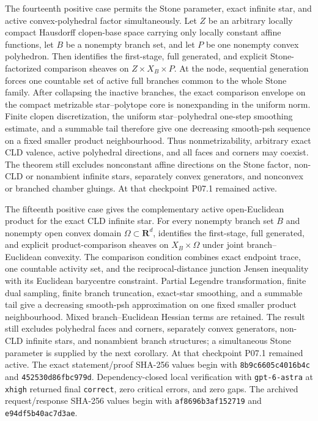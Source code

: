 The fourteenth positive case permits the Stone parameter, exact infinite
star, and active convex-polyhedral factor simultaneously.  Let \(Z\) be an
arbitrary locally compact Hausdorff clopen-base space carrying only locally
constant affine functions, let \(B\) be a nonempty branch set, and let
\(P\) be one nonempty convex polyhedron.  Then
 identifies the
first-stage, full generated, and explicit Stone-factorized comparison
sheaves on \(Z\times X_B\times P\).  At the node, sequential generation
forces one countable set of active full branches common to the whole Stone
family.  After collapsing the inactive branches, the exact comparison
envelope on the compact metrizable star--polytope core is nonexpanding in
the uniform norm.  Finite clopen discretization, the uniform
star--polyhedral one-step smoothing estimate, and a summable tail therefore
give one decreasing smooth-psh sequence on a fixed smaller product
neighbourhood.  Thus nonmetrizability, arbitrary exact CLD valence, active
polyhedral directions, and all faces and corners may coexist.  The theorem
still excludes nonconstant affine directions on the Stone factor, non-CLD
or nonambient infinite stars, separately convex generators, and nonconvex
or branched chamber gluings.  At that checkpoint P07.1 remained active.

The fifteenth positive case gives the complementary active open-Euclidean
product for the exact CLD infinite star.  For every nonempty branch set \(B\)
and nonempty open convex domain \(\Omega\subset\mathbf R^d\),
 identifies the first-stage,
full generated, and explicit product-comparison sheaves on
\(X_B\times\Omega\) under joint branch--Euclidean convexity.  The comparison
condition combines exact endpoint trace, one countable activity set, and the
reciprocal-distance junction Jensen inequality with its Euclidean barycentre
constraint.  Partial Legendre transformation, finite dual sampling, finite
branch truncation, exact-star smoothing, and a summable tail give a
decreasing smooth-psh approximation on one fixed smaller product
neighbourhood.  Mixed branch--Euclidean Hessian terms are retained.  The
result still excludes polyhedral faces and corners, separately convex
generators, non-CLD infinite stars, and nonambient branch structures; a
simultaneous Stone parameter is supplied by the next corollary.  At that checkpoint P07.1
remained active.  The exact
statement/proof SHA-256 values begin with \texttt{8b9c6605c4016b4c} and
\texttt{452530d86fbc979d}.  Dependency-closed local verification with
\texttt{gpt-6-astra} at \texttt{xhigh} returned final \texttt{correct},
zero critical errors, and zero gaps.  The archived request/response SHA-256
values begin with \texttt{af8696b3af152719} and
\texttt{e94df5b40ac7d3ae}.

